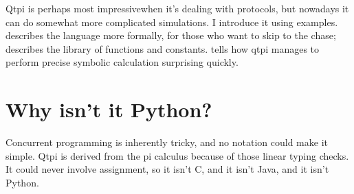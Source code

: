 Qtpi is perhaps most impressivewhen it's dealing with protocols, but nowadays it can do somewhat more complicated simulations. I introduce it using examples.  describes the language more formally, for those who want to skip to the chase;  describes the library of functions and constants.  tells how qtpi manages to perform precise symbolic calculation surprising quickly.

\section{Why isn't it Python?}

Concurrent programming is inherently tricky, and no notation could make it simple. Qtpi is derived from the pi calculus because of those linear typing checks. It could never involve assignment, so it isn't C, and it isn't Java, and it isn't Python.
